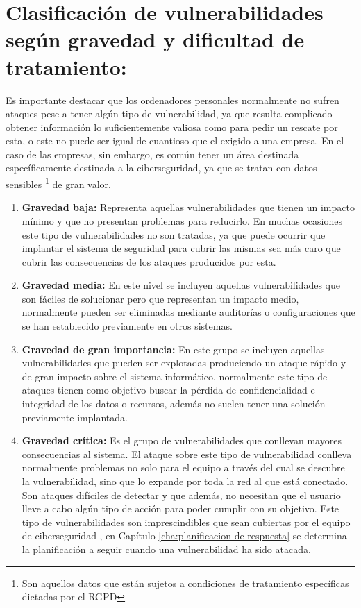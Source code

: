 \section{Clasificación de vulnerabilidades según gravedad y dificultad de tratamiento:}

Es importante destacar que los ordenadores personales normalmente no sufren ataques pese a tener algún tipo de vulnerabilidad, ya que resulta complicado obtener información lo suficientemente valiosa como para pedir un rescate por esta, o este no puede ser igual de cuantioso que el exigido a una empresa.
En el caso de las empresas, sin embargo, es común tener un área destinada específicamente destinada a la ciberseguridad, ya que se tratan con datos sensibles \footnote{Son aquellos datos que están sujetos a condiciones de tratamiento específicas dictadas por el RGPD} de gran valor.

\begin{enumerate}
\item {\bfseries Gravedad baja: }
Representa aquellas vulnerabilidades que tienen un impacto mínimo y que no presentan problemas para reducirlo. En muchas ocasiones este tipo de vulnerabilidades no son tratadas, ya que puede ocurrir que implantar el sistema de seguridad para cubrir las mismas sea más caro que cubrir las consecuencias de los ataques producidos por esta.
\item {\bfseries Gravedad media: }
En este nivel se incluyen aquellas vulnerabilidades que son fáciles de solucionar pero que representan un impacto medio, normalmente pueden ser eliminadas mediante auditorías o configuraciones que se han establecido previamente en otros sistemas.
\item {\bfseries Gravedad de gran importancia:}
En este grupo se incluyen aquellas vulnerabilidades que pueden ser explotadas produciendo un ataque rápido y de gran impacto sobre el sistema informático, normalmente este tipo de ataques tienen como objetivo buscar la pérdida de confidencialidad e integridad de los datos o recursos, además no suelen tener una solución previamente implantada.
\item {\bfseries Gravedad crítica: }
Es el grupo de vulnerabilidades que conllevan mayores consecuencias al sistema. El ataque sobre este tipo de vulnerabilidad conlleva normalmente problemas no solo para el equipo a través del cual se descubre la vulnerabilidad, sino que lo expande por toda la red al que está conectado. Son ataques difíciles de detectar y que además, no necesitan que el usuario lleve a cabo algún tipo de acción para poder cumplir con su objetivo.
Este tipo de vulnerabilidades son imprescindibles que sean cubiertas por el equipo de ciberseguridad , en Capítulo \ref{cha:planificacion-de-respuesta} se determina la planificación a seguir cuando una vulnerabilidad ha sido atacada.
\end{enumerate}


